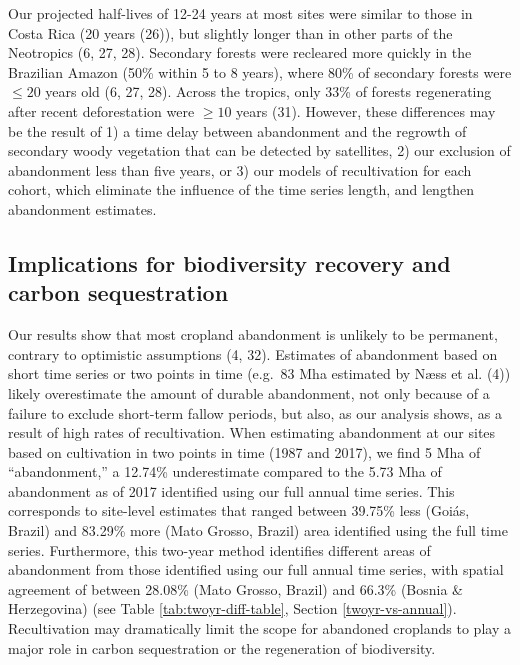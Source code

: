 \documentclass[9pt,twocolumn,twoside,]{pnas-new}
\begin{document}
Our projected half-lives of 12-24 years at most sites were similar to
those in Costa Rica (20 years (26)), but slightly longer than in other
parts of the Neotropics (6, 27, 28). Secondary forests were recleared
more quickly in the Brazilian Amazon (50\% within 5 to 8 years), where
80\% of secondary forests were \(\leq20\) years old (6, 27, 28). Across
the tropics, only 33\% of forests regenerating after recent
deforestation were \(\geq10\) years (31). However, these differences may
be the result of 1) a time delay between abandonment and the regrowth of
secondary woody vegetation that can be detected by satellites, 2) our
exclusion of abandonment less than five years, or 3) our models of
recultivation for each cohort, which eliminate the influence of the time
series length, and lengthen abandonment estimates.

\hypertarget{implications-for-biodiversity-recovery-and-carbon-sequestration}{%
\subsection{Implications for biodiversity recovery and carbon
sequestration}\label{implications-for-biodiversity-recovery-and-carbon-sequestration}}

Our results show that most cropland abandonment is unlikely to be
permanent, contrary to optimistic assumptions (4, 32). Estimates of
abandonment based on short time series or two points in time (e.g.~83
Mha estimated by Næss et al. (4)) likely overestimate the amount of
durable abandonment, not only because of a failure to exclude short-term
fallow periods, but also, as our analysis shows, as a result of high
rates of recultivation. When estimating abandonment at our sites based
on cultivation in two points in time (1987 and 2017), we find 5 Mha of
``abandonment,'' a 12.74\% underestimate compared to the 5.73 Mha of
abandonment as of 2017 identified using our full annual time series.
This corresponds to site-level estimates that ranged between 39.75\%
less (Goiás, Brazil) and 83.29\% more (Mato Grosso, Brazil) area
identified using the full time series. Furthermore, this two-year method
identifies different areas of abandonment from those identified using
our full annual time series, with spatial agreement of between 28.08\%
(Mato Grosso, Brazil) and 66.3\% (Bosnia \& Herzegovina) (see Table
\ref{tab:twoyr-diff-table}, Section \ref{twoyr-vs-annual}).
Recultivation may dramatically limit the scope for abandoned croplands
to play a major role in carbon sequestration or the regeneration of
biodiversity.
\end{document}
